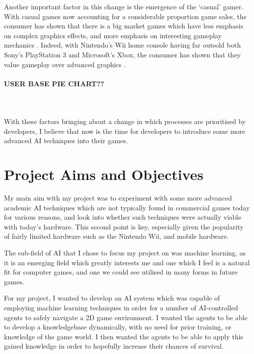 \documentclass[a4paper,oneside]{report}
\begin{document}
Another important factor in this change is the emergence of the `casual' gamer. With casual games now accounting for a considerable proportion game sales, the consumer has shown that there is a big market games which have less emphasis on complex graphics effects, and more emphasis on interesting gameplay mechanics \cite{Association:2011uq}. Indeed, with Nintendo's Wii home console having far outsold both Sony's PlayStation 3 and Microsoft's Xbox, the consumer has shown that they value gameplay over advanced graphics \cite{:2012vn, :2012kx, Inc.:ys}. 

\paragraph{USER BASE PIE CHART??}\ \\ \\

With these factors bringing about a change in which processes are prioritised by developers, I believe that now is the time for developers to introduce some more advanced AI techniques into their games.

\section{Project Aims and Objectives}

My main aim with my project was to experiment with some more advanced academic AI techniques which are not typically found in commercial games today for various reasons, and look into whether such techniques were actually viable with today's hardware. This second point is key, especially given the popularity of fairly limited hardware such as the Nintendo Wii, and mobile hardware.

The sub-field of AI that I chose to focus my project on was machine learning, as it is an emerging field which greatly interests me and one which I feel is a natural fit for computer games, and one we could see utilised in many forms in future games.

For my project, I wanted to develop an AI system which was capable of employing machine learning techniques in order for a number of AI-controlled agents to safely navigate a 2D game environment. I wanted the agents to be able to develop a knowledgebase dynamically, with no need for prior training, or knowledge of the game world. I then wanted the agents to be able to apply this gained knowledge in order to hopefully increase their chances of survival. 
\end{document}
